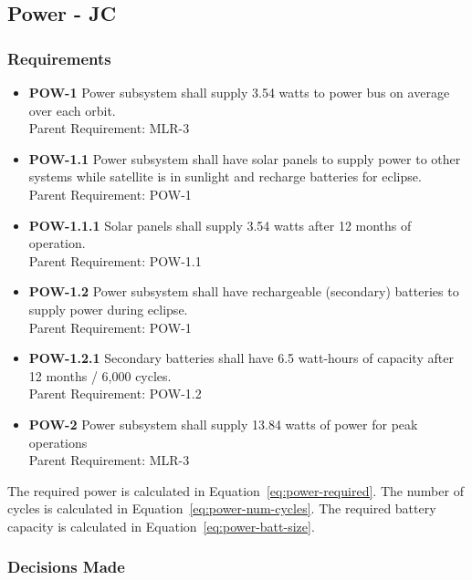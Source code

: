 \documentclass[12pt]{article}
\begin{document}
\newpage
\FloatBarrier
			
		\subsection{Power - JC} \label{sec:power}
			\subsubsection{Requirements}
			
			\begin{itemize}
				\item \textbf{POW-1}  Power subsystem shall supply 3.54 watts to power bus on average over each orbit.
				\\
				Parent Requirement: MLR-3
				\item \textbf{POW-1.1}  Power subsystem shall have solar panels to supply power to other systems while satellite is in sunlight and recharge batteries for eclipse.
				\\
				Parent Requirement: POW-1
				\item \textbf{POW-1.1.1}  Solar panels shall supply 3.54 watts after 12 months of operation.
				\\
				Parent Requirement: POW-1.1
				\item \textbf{POW-1.2}  Power subsystem shall have rechargeable (secondary) batteries to supply power during eclipse.
				\\
				Parent Requirement: POW-1
				\item \textbf{POW-1.2.1}  Secondary batteries shall have 6.5 watt-hours of capacity after 12 months / 6,000 cycles.
				\\
				Parent Requirement: POW-1.2
				\item \textbf{POW-2}  Power subsystem shall supply 13.84 watts of power for peak operations
				\\
				Parent Requirement: MLR-3
			\end{itemize}
			
			The required power is calculated in Equation~\ref{eq:power-required}.  The number of cycles is calculated in Equation~\ref{eq:power-num-cycles}.  The required battery capacity is calculated in Equation~\ref{eq:power-batt-size}.
			
			\subsubsection{Decisions Made}
			
\end{document}
